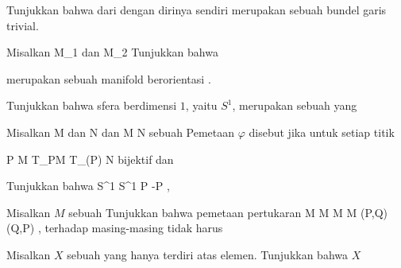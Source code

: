 {}
{

Tunjukkan bahwa
dari
dengan dirinya sendiri merupakan sebuah bundel garis trivial.

}
{} {}

{}
{

Misalkan
\mathkor {} {M_1} {dan} {M_2} {}
Tunjukkan bahwa

 merupakan sebuah manifold berorientasi
 {} {.}

}
{} {}

{}
{

Tunjukkan bahwa sfera berdimensi $1$, yaitu $S^1$, merupakan sebuah
yang

}
{} {}

Misalkan
\mathkor {} {M} {dan} {N} {}
dan
\maabbdisp {\varphi} { M } { N
} {}
sebuah
Pemetaan $\varphi$ disebut  jika untuk setiap titik

\mavergleichskette
{\vergleichskette
{ P
}
{ \in }{ M
}
{  }{
}
{    }{
}
{   }{
}
}
{}{}{}
 { T_PM } { T_{\varphi(P)} N
} {}
bijektif dan

{}
{

Tunjukkan bahwa
\maabbeledisp {\varphi} {S^1} {S^1
} { P } { -P
} {,}

}
{} {}

{}
{

Misalkan $M$ sebuah
Tunjukkan bahwa pemetaan pertukaran
\maabbeledisp {\varphi} {M \times M} {M \times M
} {(P,Q)} {(Q,P)
} {,}
terhadap masing-masing
tidak harus

}
{} {}

{}
{

Misalkan $X$ sebuah
yang hanya terdiri atas
elemen. Tunjukkan bahwa $X$

}
{} {}


